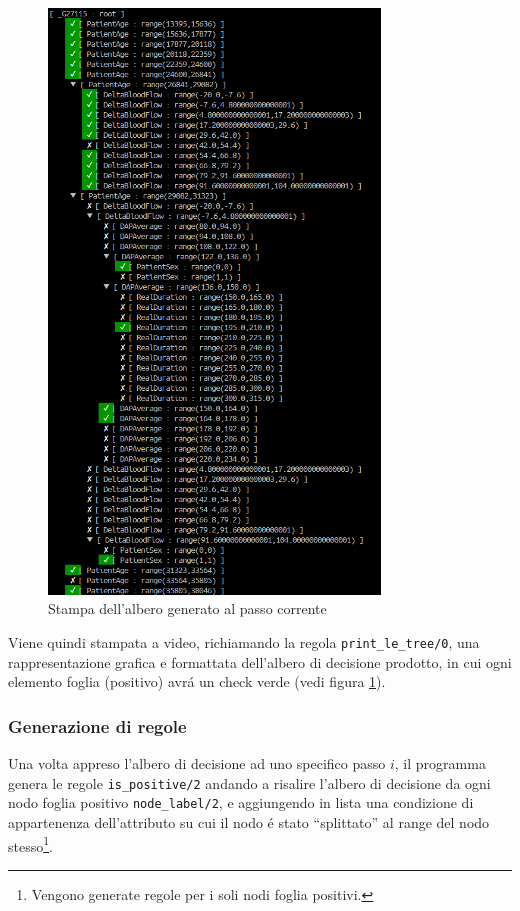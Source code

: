\documentclass[preprint]{acm_proc_article-sp}
\begin{document}
\begin{figure}[!h]
\centering
\includegraphics[width=250pt]{figures/prolog-le-tree.png}
\caption{Stampa dell'albero generato al passo corrente}
\label{fig:prolog-le-tree}
\end{figure}

Viene quindi stampata a video, richiamando la regola \verb|print_le_tree/0|, una rappresentazione grafica e formattata dell'albero di decisione prodotto, in cui ogni elemento foglia (positivo) avr\'a un check verde (vedi figura \ref{fig:prolog-le-tree}).

\subsubsection{Generazione di regole}
Una volta appreso l'albero di decisione ad uno specifico passo $i$, il programma genera le regole \verb|is_positive/2| andando a risalire l'albero di decisione da ogni nodo foglia positivo \verb|node_label/2|, e aggiungendo in lista una condizione di appartenenza dell'attributo su cui il nodo \'e stato ``splittato'' al range del nodo stesso\footnote{Vengono generate regole per i soli nodi foglia positivi.}.
\end{document}
